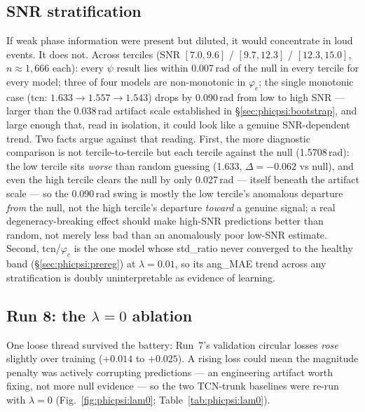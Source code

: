 \documentclass[11pt]{article}
\begin{document}
\subsection{SNR stratification}
\label{sec:phicpsi:snr}

If weak phase information were present but diluted, it would concentrate in loud events.
It does not.
Across terciles (SNR $[7.0, 9.6]$ / $[9.7, 12.3]$ / $[12.3, 15.0]$, $n \approx 1{,}666$ each): every $\psi$ result lies within 0.007\,rad of the null in every tercile for every model; three of four models are non-monotonic in $\varphi_c$; the single monotonic case (tcn: $1.633 \to 1.557 \to 1.543$) drops by 0.090\,rad from low to high SNR --- larger than the 0.038\,rad artifact scale established in \S\ref{sec:phicpsi:bootstrap}, and large enough that, read in isolation, it could look like a genuine SNR-dependent trend.
Two facts argue against that reading.
First, the more diagnostic comparison is not tercile-to-tercile but each tercile against the null (1.5708\,rad): the low tercile sits \emph{worse} than random guessing (1.633, $\Delta = -0.062$ vs null), and even the high tercile clears the null by only 0.027\,rad --- itself beneath the artifact scale --- so the 0.090\,rad swing is mostly the low tercile's anomalous departure \emph{from} the null, not the high tercile's departure \emph{toward} a genuine signal; a real degeneracy-breaking effect should make high-SNR predictions better than random, not merely less bad than an anomalously poor low-SNR estimate.
Second, tcn/$\varphi_c$ is the one model whose std\_ratio never converged to the healthy band (\S\ref{sec:phicpsi:prereg}) at $\lambda = 0.01$, so its ang\_MAE trend across any stratification is doubly uninterpretable as evidence of learning.

\subsection{Run 8: the $\lambda = 0$ ablation}
\label{sec:phicpsi:ablation}

One loose thread survived the battery: Run~7's validation circular losses \emph{rose} slightly over training ($+0.014$ to $+0.025$).
A rising loss could mean the magnitude penalty was actively corrupting predictions --- an engineering artifact worth fixing, not more null evidence --- so the two TCN-trunk baselines were re-run with $\lambda = 0$ (Fig.~\ref{fig:phicpsi:lam0}; Table~\ref{tab:phicpsi:lam0}).
\end{document}
